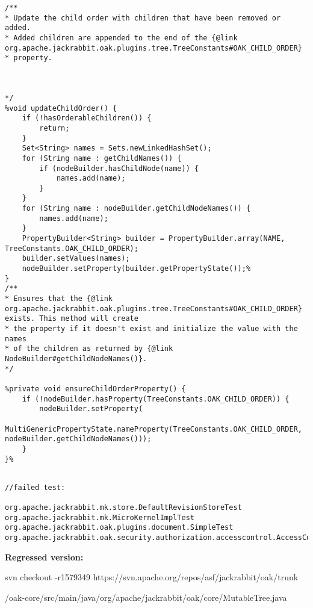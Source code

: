 \documentclass{article}
\begin{document}
\begin{lstlisting}[frame=single]
/**
* Update the child order with children that have been removed or added.
* Added children are appended to the end of the {@link org.apache.jackrabbit.oak.plugins.tree.TreeConstants#OAK_CHILD_ORDER}
* property.



*/
%void updateChildOrder() {
	if (!hasOrderableChildren()) {
		return;
	}
	Set<String> names = Sets.newLinkedHashSet();
	for (String name : getChildNames()) {
		if (nodeBuilder.hasChildNode(name)) {
			names.add(name);
		}
	}
	for (String name : nodeBuilder.getChildNodeNames()) {
		names.add(name);
	}
	PropertyBuilder<String> builder = PropertyBuilder.array(NAME, TreeConstants.OAK_CHILD_ORDER);
	builder.setValues(names);
	nodeBuilder.setProperty(builder.getPropertyState());%
}
/**
* Ensures that the {@link org.apache.jackrabbit.oak.plugins.tree.TreeConstants#OAK_CHILD_ORDER} exists. This method will create
* the property if it doesn't exist and initialize the value with the names
* of the children as returned by {@link NodeBuilder#getChildNodeNames()}.
*/

%private void ensureChildOrderProperty() {
	if (!nodeBuilder.hasProperty(TreeConstants.OAK_CHILD_ORDER)) {
		nodeBuilder.setProperty(
		MultiGenericPropertyState.nameProperty(TreeConstants.OAK_CHILD_ORDER, nodeBuilder.getChildNodeNames()));
	}
}%
\end{lstlisting}
\begin{lstlisting}[frame=single]

//failed test:

org.apache.jackrabbit.mk.store.DefaultRevisionStoreTest
org.apache.jackrabbit.mk.MicroKernelImplTest
org.apache.jackrabbit.oak.plugins.document.SimpleTest
org.apache.jackrabbit.oak.security.authorization.accesscontrol.AccessControlManagerImplTest

\end{lstlisting}
\clearpage
\textbf{Regressed version:}

svn checkout -r1579349 https://svn.apache.org/repos/asf/jackrabbit/oak/trunk

/oak-core/src/main/java/org/apache/jackrabbit/oak/core/MutableTree.java
\end{document}
